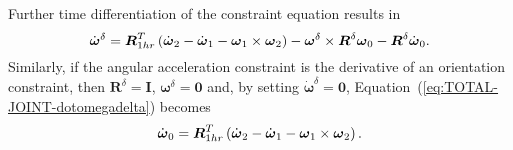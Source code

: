 \documentclass[10pt,dvips,fleqn]{report}
\newcommand{\T}[1]{\boldsymbol{#1}}
\begin{document}
Further time differentiation of the constraint equation results in
\begin{equation}
	\dot{\T{\omega}}^{\delta}
	= \T{R}_{1hr}^T\plbr{
		\dot{\T{\omega}}_2
		- \dot{\T{\omega}}_1
		- \T{\omega}_1 \times \T{\omega}_2
	} - \T{\omega}^{\delta} \times \T{R}^{\delta} \T{\omega}_0
	- \T{R}^{\delta} \dot{\T{\omega}}_0 .
	\label{eq:TOTAL-JOINT-dotomegadelta}
\end{equation}
Similarly, if the angular acceleration constraint 
is the derivative of an orientation constraint,
then $\T{R}^{\delta}=\T{I}$, $\T{\omega}^{\delta}=\T{0}$
and, by setting $\dot{\T{\omega}}^{\delta}=\T{0}$,
Equation~(\ref{eq:TOTAL-JOINT-dotomegadelta}) becomes
\begin{equation}
	\dot{\T{\omega}}_0 = \T{R}_{1hr}^T\plbr{
		\dot{\T{\omega}}_2
		- \dot{\T{\omega}}_1
		- \T{\omega}_1 \times \T{\omega}_2
	} .
\end{equation}
\end{document}
